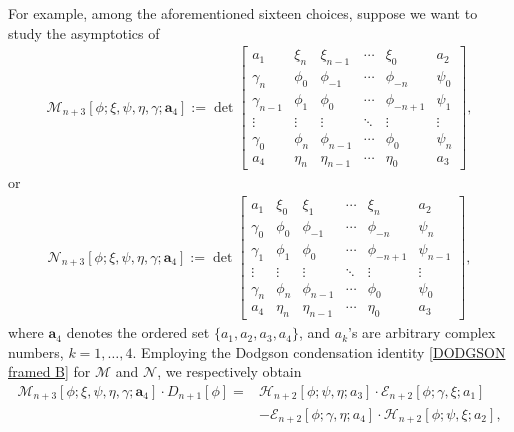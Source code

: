 \documentclass[10pt,a4paper]{amsart}
\numberwithin{equation}{section}
\newcommand{\ga}{\gamma}
\begin{document}
For example, among the aforementioned sixteen choices, suppose we want to study the asymptotics of
		\begin{gather*}%
			\mathscr{M}_{n+3}[\phi; \xi, \psi, \eta, \ga; \boldsymbol{a}_4] := \det \begin{bmatrix}
				a_1 & \xi_{n} & \xi_{n-1} & \cdots & \xi_{0} & a_2 \\
				\ga_{n} &	\phi_0& \phi_{-1} & \cdots & \phi_{-n} & \psi_{0} \\
				\ga_{n-1} &	\phi_{1}& \phi_0 & \cdots & \phi_{-n+1} & \psi_{1} \\
				\vdots &	\vdots & \vdots & \ddots & \vdots & \vdots \\
				\ga_0 &	\phi_{n} & \phi_{n-1} & \cdots & \phi_{0} & \psi_{n} \\
				a_4 &	\eta_{n} & \eta_{n-1} & \cdots & \eta_{0} & a_3
			\end{bmatrix},
		\end{gather*}
		or
		\begin{gather*}
			\mathscr{N}_{n+3}[\phi; \xi, \psi, \eta, \ga; \boldsymbol{a}_4] := \det \begin{bmatrix}
				a_1 & \xi_{0} & \xi_{1} & \cdots & \xi_{n} & a_2 \\
				\ga_{0} &	\phi_0& \phi_{-1} & \cdots & \phi_{-n} & \psi_{n} \\
				\ga_{1} &	\phi_{1}& \phi_0 & \cdots & \phi_{-n+1} & \psi_{n-1} \\
				\vdots &	\vdots & \vdots & \ddots & \vdots & \vdots \\
				\ga_n &	\phi_{n} & \phi_{n-1} & \cdots & \phi_{0} & \psi_{0} \\
				a_4 &	\eta_{n} & \eta_{n-1} & \cdots & \eta_{0} & a_3
			\end{bmatrix},
		\end{gather*}
		where $\boldsymbol{a}_4$ denotes the ordered set $\{a_1, a_2, a_3, a_4\}$, and $a_k$'s are arbitrary complex numbers, ${k=1,\dots,4}$. Employing the Dodgson condensation identity \eqref{DODGSON framed B} for $\mathscr{M}$ and $\mathscr{N}$, we respectively obtain
		\begin{align}
			\mathscr{M}_{n+3}[\phi; \xi, \psi, \eta, \ga; \boldsymbol{a}_4] \cdot D_{n+1}[\phi] ={}& \mathscr{H}_{n+2}[\phi;\psi,\eta;a_3] \cdot \mathscr{E}_{n+2}[\phi;\ga,\xi;a_1]\nonumber \\
 &- \mathscr{E}_{n+2}[\phi;\ga,\eta;a_4] \cdot \mathscr{H}_{n+2}[\phi;\psi,\xi;a_2], 	\label{M in terms of semi-framed stuff}
		\end{align}
\end{document}
